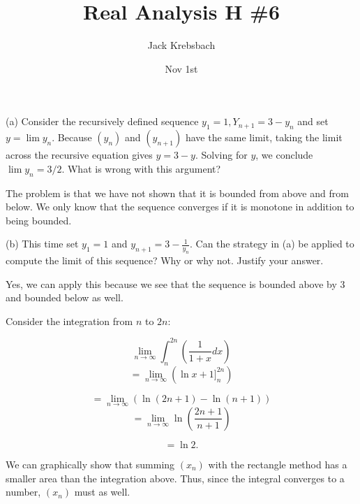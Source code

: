 \documentclass{report}
\title{Real Analysis H \#6}
\author{Jack Krebsbach }
\date{Nov 1st}
\begin{document}
\maketitle


(a) Consider the recursively defined sequence $y_1=1, Y_{n+1}=3-y_n$ and set $y=\lim y_n$. Because $\left(y_n\right)$ and $\left(y_{n+1}\right)$ have the same limit, taking the limit across the recursive equation gives $y=3-y$. Solving for $y$, we conclude $\lim y_n=3 / 2$. What is wrong with this argument?

\bigskip
\sol 

The problem is that we have not shown that it is bounded from above and from below. We only know that the sequence converges if it is monotone in addition to being bounded. 


\bigskip
(b) This time set $y_1=1$ and $y_{n+1}=3-\frac{1}{y_n}$. Can the strategy in (a) be applied to compute the limit of this sequence? Why or why not. Justify your answer.

\bigskip
\sol 

Yes, we can apply this because we see that the sequence is bounded above by 3 and bounded below as well.


\bigskip


\begin{myproof}

Consider the integration from $n$ to $2n$:
 
$$ \lim_{n \rightarrow \infty} \int_{n}^{2n} \left( \frac{1}{1+x} dx  \right)$$
$$= \lim_{n \rightarrow \infty} \left(\ln x+1 ]_{n}^{2n} \right)$$

$$= \lim_{n \rightarrow \infty} \left(\ln (2n+1) - \ln (n+1) \right)$$
$$= \lim_{n \rightarrow \infty} \ln \left(\frac{2n+1}{n+1}\right)$$

$$=  \ln 2.$$

We can graphically show that summing $(x_n)$ with the rectangle method has a smaller area than the integration above. Thus, since the integral converges to a number, $(x_n)$ must as well. 

\end{myproof}


\pagebreak
\end{document}

